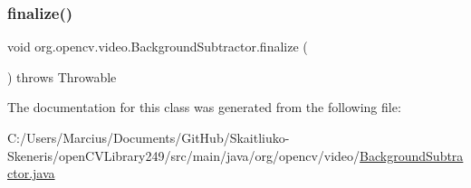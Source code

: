 \subsubsection{\texorpdfstring{finalize()}{finalize()}}
{\footnotesize\ttfamily void org.\+opencv.\+video.\+Background\+Subtractor.\+finalize (\begin{DoxyParamCaption}{ }\end{DoxyParamCaption}) throws Throwable\hspace{0.3cm}{\ttfamily [protected]}}



The documentation for this class was generated from the following file\+:\begin{DoxyCompactItemize}
\item 
C\+:/\+Users/\+Marcius/\+Documents/\+Git\+Hub/\+Skaitliuko-\/\+Skeneris/open\+C\+V\+Library249/src/main/java/org/opencv/video/\mbox{\hyperlink{_background_subtractor_8java}{Background\+Subtractor.\+java}}\end{DoxyCompactItemize}
